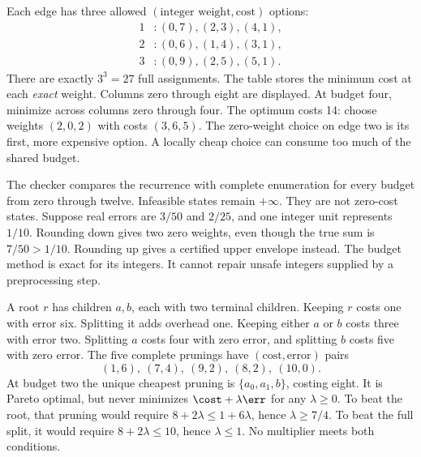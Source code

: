 Each edge has three allowed $(\text{integer weight},\text{cost})$ options:
\[
\begin{aligned}
1 &: (0,7),(2,3),(4,1),\\
2 &: (0,6),(1,4),(3,1),\\
3 &: (0,9),(2,5),(5,1).
\end{aligned}
\]
There are exactly $3^3=27$ full assignments. The table stores the minimum cost at each \emph{exact} weight. Columns zero through eight are displayed.
At budget four, minimize across columns zero through four. The optimum costs 14: choose weights $(2,0,2)$ with costs $(3,6,5)$. The zero-weight choice on edge two is its first, more expensive option. A locally cheap choice can consume too much of the shared budget.

The checker compares the recurrence with complete enumeration for every budget from zero through twelve. Infeasible states remain $+\infty$. They are not zero-cost states.
Suppose real errors are $3/50$ and $2/25$, and one integer unit represents $1/10$. Rounding down gives two zero weights, even though the true sum is $7/50>1/10$. Rounding up gives a certified upper envelope instead. The budget method is exact for its integers. It cannot repair unsafe integers supplied by a preprocessing step.

A root $r$ has children $a,b$, each with two terminal children. Keeping $r$ costs one with error six. Splitting it adds overhead one. Keeping either $a$ or $b$ costs three with error two. Splitting $a$ costs four with zero error, and splitting $b$ costs five with zero error.
The five complete prunings have $(\text{cost},\text{error})$ pairs
\[
(1,6),\ (7,4),\ (9,2),\ (8,2),\ (10,0).
\]
At budget two the unique cheapest pruning is $\{a_0,a_1,b\}$, costing eight. It is Pareto optimal, but never minimizes $\cost+\lambda\err$ for any $\lambda\ge0$.
To beat the root, that pruning would require $8+2\lambda\le1+6\lambda$, hence $\lambda\ge7/4$. To beat the full split, it would require $8+2\lambda\le10$, hence $\lambda\le1$. No multiplier meets both conditions.

